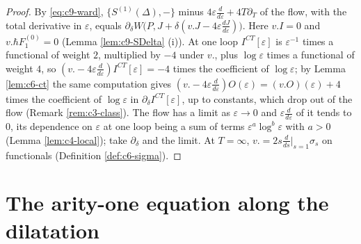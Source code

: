\begin{proof}
By \eqref{eq:c9-ward}, $\{S^{(1)}(\Delta),-\}$ minus $4\varepsilon\frac{d}{d\varepsilon}+4T\partial_T$ of the flow, with the total derivative in $\varepsilon$, equals $\partial_\delta W\big(P,J+\delta(v.J-4\varepsilon\frac{dJ}{d\varepsilon})\big)$. Here $v.I=0$ and $v.\hbar F_1^{(0)}=0$ (Lemma \ref{lem:c9-SDelta} (i)). At one loop $I^{CT}[\varepsilon]$ is $\varepsilon^{-1}$ times a functional of weight $2$, multiplied by $-4$ under $v.$, plus $\log\varepsilon$ times a functional of weight $4$, so $(v.-4\varepsilon\frac d{d\varepsilon})I^{CT}[\varepsilon]=-4$ times the coefficient of $\log\varepsilon$; by Lemma \ref{lem:c6-ct} the same computation gives $(v.-4\varepsilon\frac d{d\varepsilon})O(\varepsilon)=(v.O)(\varepsilon)+4$ times the coefficient of $\log\varepsilon$ in $\partial_\delta I^{CT}[\varepsilon]$, up to constants, which drop out of the flow (Remark \ref{rem:c3-class}). The flow has a limit as $\varepsilon\to0$ and $\varepsilon\frac d{d\varepsilon}$ of it tends to $0$, its dependence on $\varepsilon$ at one loop being a sum of terms $\varepsilon^a\log^b\varepsilon$ with $a>0$ (Lemma \ref{lem:c4-local}); take $\partial_\delta$ and the limit. At $T=\infty$, $v.=2s\frac{d}{ds}\big|_{s=1}\sigma_s$ on functionals (Definition \ref{def:c6-sigma}).
\end{proof}

\section{The arity-one equation along the dilatation}

